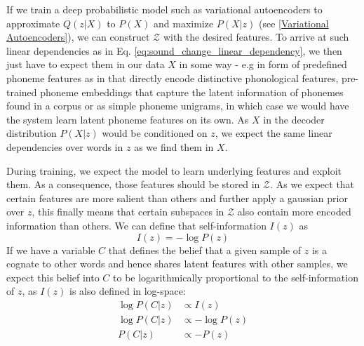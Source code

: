 \documentclass[6pt]{article}
\begin{document}
If we train a deep probabilistic model such as variational autoencoders to approximate $Q(z|X)$ to $P(X)$ and maximize $P(X|z)$ (see \ref{Variational Autoencoders}), we can construct $\mathcal{Z}$ with the desired features. To arrive at such linear dependencies as in Eq. \ref{eq:sound_change_linear_dependency}, we then just have to expect them in our data $X$ in some way - e.g in form of predefined phoneme features as in \cite{kondrak2000new,list2012sca,rama2016siamese} that directly encode distinctive phonological features, pre-trained phoneme embeddings that capture the latent information of phonemes found in a corpus or as simple phoneme unigrams, in which case we would have the system learn latent phoneme features on its own. As $X$ in the decoder distribution $P(X|z)$ would be conditioned on $z$, we expect the same linear dependencies over words in $z$ as we find them in $X$.







During training, we expect the model to learn underlying features and exploit them. As a consequence, those features should be stored in $\mathcal{Z}$. As we expect that certain features are more salient than others and further apply a gaussian prior over $z$, this finally means that certain subspaces in $\mathcal{Z}$ also contain more encoded information than others. We can define that self-information $I(z)$ as
\begin{equation}
I(z) = - \log P(z)
\end{equation}
If we have a variable $C$ that defines the belief that a given sample of $z$ is a cognate to other words and hence shares latent features with other samples, we expect this belief into $C$ to be logarithmically proportional to the self-information of $z$, as $I(z)$ is also defined in log-space:
\begin{equation}
\begin{split}
\log P(C|z) & \propto  I(z) \\
\log P(C|z) & \propto  - \log P(z) \\
P(C|z) & \propto  - P(z) 
\end{split}
\end{equation}
\end{document}
